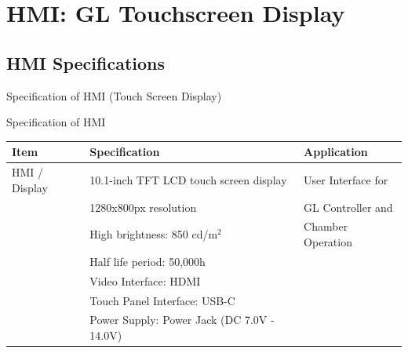 \chapter{HMI: GL Touchscreen Display}
\label{appdxb} 

\section{HMI Specifications}
Specification of HMI (Touch Screen Display)

\begin{table2}[label={mynamelabel},nameref={Title}]{Specification of HMI} {\label{tab:hmi-specs}}
{%
\begin{tabular}{l | l | l}
{\bf{Item}} & {\bf{Specification}} & {\bf{Application}} \\
\hline \hline 
HMI / Display & 10.1-inch TFT LCD touch screen display &  User Interface for \\
              & 1280x800px resolution &  GL Controller and \\
              & High brightness: 850 cd/m$^2$ & Chamber Operation \\
              & Half life period: 50,000h & \\
              & Video Interface: HDMI & \\
              & Touch Panel Interface: USB-C \\
              & Power Supply: Power Jack (DC 7.0V - 14.0V) & \\ 
\end{tabular} 
}
\end{table2}
